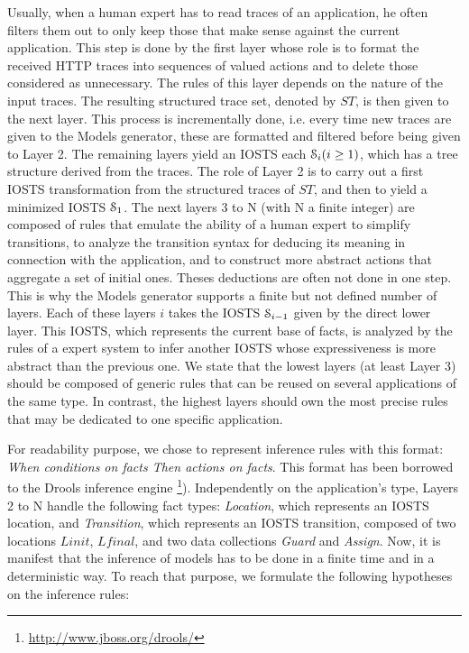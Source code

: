 Usually, when a human expert has to read traces of an
application, he often filters them out to only keep those that
make sense against the current application. This step is done by
the first layer whose role is to format the received HTTP traces
into sequences of valued actions and to delete those considered
as unnecessary. The rules of this layer depends on the nature of
the input traces. The resulting structured trace set, denoted by
$ST$, is then given to the next layer. This process is
incrementally done, i.e. every time new traces are given to the
Models generator, these are formatted and filtered before being
given to Layer 2. The remaining layers yield an IOSTS each
$\EuScript{S}_i (i\geq 1)$, which has a tree structure derived
from the traces. The role of Layer 2 is to carry out a first
IOSTS transformation from the structured traces of $ST$, and then
to yield a minimized IOSTS $\EuScript{S}_1$. The next layers
3 to N (with N a finite integer) are composed of rules that
emulate the ability of a human expert to simplify transitions, to
analyze the transition syntax for deducing its meaning in
connection with the application, and to construct more abstract
actions that aggregate a set of initial ones. Theses deductions
are often not done in one step. This is why the Models generator
supports a finite but not defined number of layers.  Each of
these layers $i$ takes the IOSTS $\EuScript{S}_{i-1}$ given by
the direct lower layer. This IOSTS, which represents the current
base of facts, is analyzed by the rules of a expert system to
infer another IOSTS whose expressiveness is more abstract than
the previous one. We state that the lowest layers (at least Layer
3) should be composed of generic rules that can be reused on
several applications of the same type. In contrast, the highest
layers should own the most precise rules that may be dedicated to
one specific application.

For readability purpose, we chose to represent inference rules
with this format: \textit{When conditions on facts Then actions on
facts}. This format has been borrowed to the Drools inference
engine \footnote{\url{http://www.jboss.org/drools/}}). Independently
on the application's type, Layers 2 to N handle the following
fact types: \textit{Location}, which represents an IOSTS location,
and \textit{Transition}, which represents an IOSTS transition,
composed of two locations $Linit$, $Lfinal$, and two data
collections \textit{Guard} and \textit{Assign}. Now, it is
manifest that the inference of models has to be done in a finite
time and in a deterministic way. To reach that purpose, we
formulate the following hypotheses on the inference rules:

